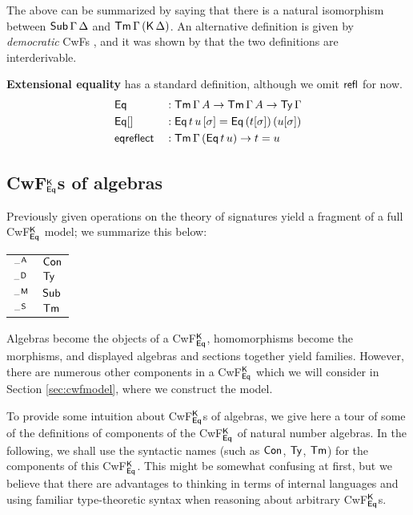 \documentclass[acmsmall,review,anonymous]{acmart}\settopmatter{printfolios=true,printccs=false,printacmref=false}
\begin{document}
The above can be summarized by saying that there is a natural isomorphism
between $\mathsf{Sub}\,\Gamma\,\Delta$ and $\mathsf{Tm}\,\Gamma\,(\mathsf{K}\,\Delta)$. An
alternative definition is given by \emph{democratic} CwFs
\cite{clairambault2014biequivalence}, and it was shown by
\cite{forsberg-phd} that the two definitions are interderivable.

\textbf{Extensional equality} has a standard definition, although we omit $\mathsf{refl}$ for now.
\begin{alignat*}{5}
  & \mathsf{Eq}      && : \mathsf{Tm}\,\Gamma\,A \rightarrow \mathsf{Tm}\,\Gamma\,A \rightarrow \mathsf{Ty}\,\Gamma \\
  & \mathsf{Eq}[]    && : \mathsf{Eq}\,t\,u\,[\sigma] = \mathsf{Eq}\,(t[\sigma])\,(u[\sigma]) \\
  & \mathsf{eqreflect} && : \mathsf{Tm}\,\Gamma\,(\mathsf{Eq}\,t\,u) \rightarrow t = u
\end{alignat*}

\subsection{CwF$^{\mathsf{K}}_{\mathsf{Eq}}$s of algebras}
\label{sec:cwfalg}

Previously given operations on the theory of signatures yield a
fragment of a full CwF$^{\mathsf{K}}_{\mathsf{Eq}}$ model; we summarize this below:

\vspace{1em}
\begin{tabular}{l l}
  $\mathord{\hspace{1pt}\text{--}\hspace{1pt}}^{\mathsf{A}}$ & \hspace{1em}$\mathsf{Con}$ \\
  $\mathord{\hspace{1pt}\text{--}\hspace{1pt}}^{\mathsf{D}}$ & \hspace{1em}$\mathsf{Ty}$  \\
  $\mathord{\hspace{1pt}\text{--}\hspace{1pt}}^{\mathsf{M}}$ & \hspace{1em}$\mathsf{Sub}$ \\
  $\mathord{\hspace{1pt}\text{--}\hspace{1pt}}^{\mathsf{S}}$ & \hspace{1em}$\mathsf{Tm}$
\end{tabular}
\vspace{1em}

Algebras become the objects of a CwF$^{\mathsf{K}}_{\mathsf{Eq}}$, homomorphisms become
the morphisms, and displayed algebras and sections together yield
families. However, there are numerous other components in a
CwF$^{\mathsf{K}}_{\mathsf{Eq}}$ which we will consider in Section \ref{sec:cwfmodel},
where we construct the model.

To provide some intuition about CwF$^{\mathsf{K}}_{\mathsf{Eq}}$s of algebras, we give
here a tour of some of the definitions of components of the
CwF$^{\mathsf{K}}_{\mathsf{Eq}}$ of natural number algebras. In the following, we shall
use the syntactic names (such as $\mathsf{Con}$, $\mathsf{Ty}$, $\mathsf{Tm}$) for the
components of this CwF$^{\mathsf{K}}_{\mathsf{Eq}}$. This might be somewhat confusing at
first, but we believe that there are advantages to thinking in terms
of internal languages and using familiar type-theoretic syntax when
reasoning about arbitrary CwF$^{\mathsf{K}}_{\mathsf{Eq}}$s.
\end{document}
